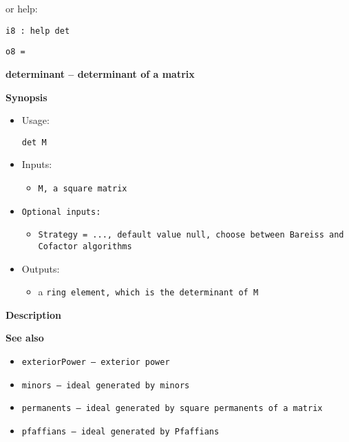 \documentclass[12pt,a4paper]{amsart}
\begin{document}
or help:
\smallskip
\begin{verbatim}
i8 : help det
\end{verbatim}
\noindent\verb|o8 = |
\par \medskip\noindent\begingroup\Large\bf
determinant -- determinant of a matrix\endgroup
\par \smallskip%

\par \medskip\noindent\begingroup\Large\bf
Synopsis\endgroup
\par \smallskip%
\begin{itemize}
\item 
\par Usage: 
\par \begingroup\tt det\ M\endgroup{}
\item Inputs:\begin{itemize}
\item \begingroup\tt M\endgroup{}, a square \begingroup\tt matrix\endgroup{}
\end{itemize}

\item \begingroup\tt Optional\ inputs\endgroup{}:\begin{itemize}
\item \begingroup\tt Strategy\endgroup{}\begingroup\tt \ ={}\ \endgroup{}\begingroup\tt ...\endgroup{}, default value null, choose between Bareiss and Cofactor algorithms
\end{itemize}

\item Outputs:\begin{itemize}
\item a \begingroup\tt ring\ element\endgroup{}, which is the determinant of \begingroup\tt M\endgroup{}
\end{itemize}

\end{itemize}

\par \medskip\noindent\begingroup\Large\bf
Description\endgroup
\par \smallskip%

\par \medskip\noindent\begingroup\Large\bf
See also\endgroup
\par \smallskip%
\begin{itemize}
\item \begingroup\tt exteriorPower\endgroup{} -- exterior power
\item \begingroup\tt minors\endgroup{} -- ideal generated by minors
\item \begingroup\tt permanents\endgroup{} -- ideal generated by square permanents of a matrix
\item \begingroup\tt pfaffians\endgroup{} -- ideal generated by Pfaffians
\end{itemize}
\end{document}
